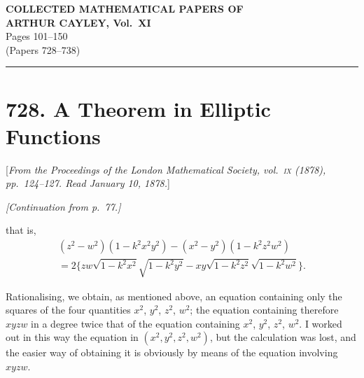 \documentclass[12pt,a4paper]{article}
\theoremstyle{plain}
\begin{document}
\begin{center}
{\Large\bfseries COLLECTED MATHEMATICAL PAPERS OF\\[4pt]
ARTHUR CAYLEY, Vol.~XI}\\[12pt]
{\large Pages 101--150}\\[8pt]
{\normalsize (Papers 728--738)}
\end{center}

\vspace{1em}
\hrule
\vspace{1.5em}

\section*{728. A Theorem in Elliptic Functions}

[\textit{From the Proceedings of the London Mathematical Society, vol.~\textsc{ix} (1878), pp.~124--127.
Read January 10, 1878.}]

\vspace{0.5em}
\noindent\textit{[Continuation from p.~77.]}

\vspace{0.5em}
\noindent
that is,
\begin{multline*}
(z^2-w^2)(1-k^2x^2y^2) - (x^2-y^2)(1-k^2z^2w^2) \\
= 2\{zw\sqrt{1-k^2x^2}\sqrt{1-k^2y^2} - xy\sqrt{1-k^2z^2}\sqrt{1-k^2w^2}\}.
\end{multline*}

Rationalising, we obtain, as mentioned above, an equation containing only the squares
of the four quantities $x^2$, $y^2$, $z^2$, $w^2$; the equation containing therefore
$xyzw$ in a degree twice that of the equation containing $x^2$, $y^2$, $z^2$, $w^2$.
I worked out in this way the equation in $(x^2, y^2, z^2, w^2)$, but the calculation
was lost, and the easier way of obtaining it is obviously by means of the equation
involving $xyzw$.
\end{document}
